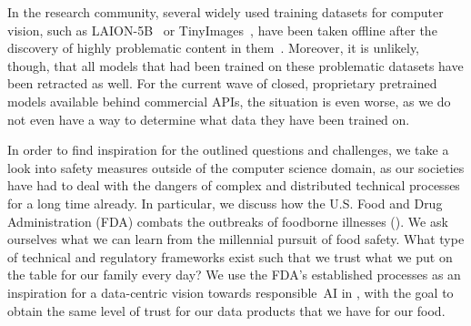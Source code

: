 In the research community, several widely used training datasets for computer vision, such as LAION-5B~\cite{schuhmann2022laion} or TinyImages~\cite{torralba200880}, have been taken offline after the discovery of highly problematic content in them~\cite{birhane2021large,birhane2023hate}. Moreover, it is unlikely, though, that all models that had been trained on these problematic datasets have been retracted as well. For the current wave of closed, proprietary pretrained models available behind commercial APIs, the situation is even worse, as we do not even have a way to determine what data they have been trained on.

 In order to find inspiration for the outlined questions and challenges, we take a look into safety measures outside of the computer science domain, as our societies have had to deal with the dangers of complex and distributed technical processes for a long time already. In particular, we discuss how the U.S. Food and Drug Administration (FDA) combats the outbreaks of foodborne illnesses (). We ask ourselves what we can learn from the millennial pursuit of food safety. What type of technical and regulatory frameworks exist such that we trust what we put on the table for our family every day? We use the FDA's established processes as an inspiration for a data-centric vision towards responsible~AI in , with the goal to obtain the same level of trust for our data products that we have for our food.






